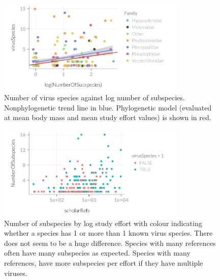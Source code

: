 


\begin{knitrout}\footnotesize
{}\color{fgcolor}\begin{figure}[t]

{\centering \includegraphics[width=0.8\textwidth]{figure/plotSubspecies-1} 

}

\caption[Number of virus species against log number of subspecies]{Number of virus species against log number of subspecies. Nonphylogenetic trend line in blue. Phylogenetic model (evaluated at mean body mass and mean study effort values) is shown in red.}\label{fig:plotSubspecies}
\end{figure}


\end{knitrout}




\begin{knitrout}\footnotesize
{}\color{fgcolor}\begin{figure}[t]

{\centering \includegraphics[width=0.8\textwidth]{figure/OneorMoreVir-1} 

}

\caption[Number of subspecies by study effort]{Number of subspecies by log study effort with colour indicating whether a species has 1 or more than 1 known virus species.
There does not seem to be a huge difference.
Species with many references often have many subspecies as expected.
Species with many references, have more subspecies per effort if they have multiple viruses.}\label{fig:OneorMoreVir}
\end{figure}


\end{knitrout}


